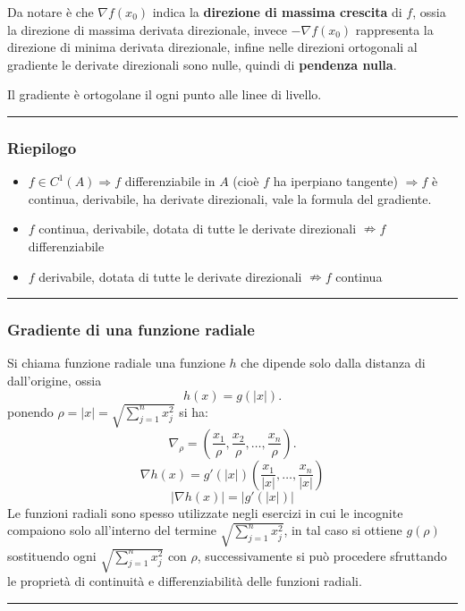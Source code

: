 \begin{tcolorbox}
Da notare è che $\nabla f(x_0)$ indica la \textbf{direzione di massima crescita} di $f$, ossia la direzione di massima derivata direzionale, invece $-\nabla f(x_0)$ rappresenta la direzione di minima derivata direzionale, infine nelle direzioni ortogonali al gradiente le derivate direzionali sono nulle, quindi di \textbf{pendenza nulla}.
\end{tcolorbox}
\begin{tcolorbox}
Il gradiente è ortogolane il ogni punto alle linee di livello.
\end{tcolorbox}
\rule{\textwidth}{0.4pt}
\subsubsection*{Riepilogo}
\begin{itemize}
    \item $f \in C^1(A) \Rightarrow f$ differenziabile in $A$ (cioè $f$ ha iperpiano tangente) $\Rightarrow f$ è continua, derivabile, ha derivate direzionali, vale la formula del gradiente.
    \item $f$ continua, derivabile, dotata di tutte le derivate direzionali $\nRightarrow f$ differenziabile
    \item $f$ derivabile, dotata di tutte le derivate direzionali $\nRightarrow f$ continua 
\end{itemize}
\rule{\textwidth}{0.4pt}
\subsubsection*{Gradiente di una funzione radiale}
Si chiama funzione radiale una funzione $h$ che dipende solo dalla distanza di dall'origine, ossia
\[
    h(x) = g(|x|).
\]
ponendo $\rho = |x| = \sqrt{\sum_{j=1}^{n}x_j^2}$ si ha:
\[
    \nabla_\rho = ( \frac{x_1}{\rho}, \frac{x_2}{\rho}, \dots, \frac{x_n}{\rho}).
\]
\[
    \nabla h(x) = g'(|x|)( \frac{x_1}{|x|}, \dots, \frac{x_n}{|x|})
\]
\[
    |\nabla h(x)| = |g'(|x|)|
\]
Le funzioni radiali sono spesso utilizzate negli esercizi in cui le incognite compaiono solo all'interno del termine $\sqrt{\sum_{j=1}^{n}x_j^2}$, in tal caso si ottiene $g(\rho)$ sostituendo ogni $\sqrt{\sum_{j=1}^{n}x_j^2}$ con $ \rho$, successivamente si può procedere sfruttando le proprietà di continuità e differenziabilità delle funzioni radiali.\newline
\rule{\textwidth}{0.4pt}
